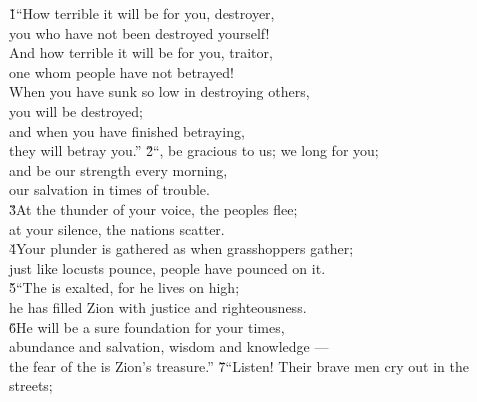 \begin{poetry}
\poeml {}
\v{1}``How terrible it will be for you, destroyer, \\
\poemll    you who have not been destroyed yourself! \\
\poeml And how terrible it will be for you, traitor, \\
\poemll    one whom people have not betrayed! \\
\poeml When you have sunk so low in destroying others, \\
\poemll    you will be destroyed; \\
\poeml and when you have finished betraying, \\
\poemll    they will betray you.''
\poeml \v{2}``, be gracious to us; we long for you; \\
\poemll    and be our strength every morning, \\
\poemlll       our salvation in times of trouble. \\
\poeml \v{3}At the thunder of your voice, the peoples flee; \\
\poemll    at your silence, the nations scatter. \\
\poeml \v{4}Your plunder is gathered as when grasshoppers gather; \\
\poemll    just like locusts pounce, people have pounced on it. \\
\poeml \v{5}``The  is exalted, for he lives on high; \\
\poemll    he has filled Zion with justice and righteousness. \\
\poeml \v{6}He will be a sure foundation for your times, \\
\poemll    abundance and salvation, wisdom and knowledge --- \\
\poemlll       the fear of the  is Zion's treasure.''
\poeml \v{7}``Listen! Their brave men cry out in the streets; \\

\end{poetry}
